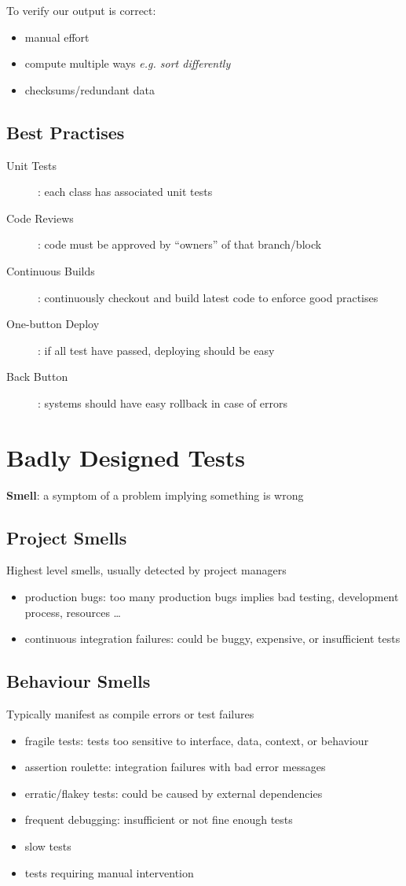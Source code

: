 \documentclass[]{article}
\theoremstyle{definition}
\begin{document}
	To verify our output is correct:
	\begin{itemize}
		\item manual effort 
		\item compute multiple ways \textit{e.g. sort differently}
		\item checksums/redundant data
	\end{itemize}

	\subsection{Best Practises}
	\begin{description}
		\item[Unit Tests]: each class has associated unit tests
		\item[Code Reviews]: code must be approved by ``owners'' of that branch/block
		\item[Continuous Builds]: continuously checkout and build latest code to enforce good practises
		\item[One-button Deploy]: if all test have passed, deploying should be easy
		\item[Back Button]: systems should have easy rollback in case of errors
	\end{description}

	\section{Badly Designed Tests}
	\textbf{Smell}: a symptom of a problem implying something is wrong

	\subsection{Project Smells}
	Highest level smells, usually detected by project managers
	\begin{itemize}
		\item production bugs: too many production bugs implies bad testing, development process, resources \dots
		\item continuous integration failures: could be buggy, expensive, or insufficient tests
	\end{itemize}

	\subsection{Behaviour Smells}
	Typically manifest as compile errors or test failures
	\begin{itemize}
		\item fragile tests: tests too sensitive to interface, data, context, or behaviour
		\item assertion roulette: integration failures with bad error messages
		\item erratic/flakey tests: could be caused by external dependencies
		\item frequent debugging: insufficient or not fine enough tests
		\item slow tests
		\item tests requiring manual intervention
	\end{itemize}
\end{document}
